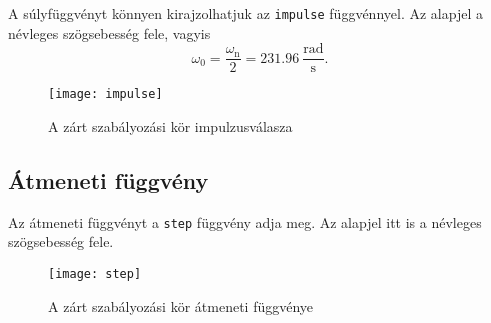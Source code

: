 A súlyfüggvényt könnyen kirajzolhatjuk az \verb|impulse| függvénnyel.
Az alapjel a névleges szögsebesség fele, vagyis
\begin{equation}
	\omega_0 = \frac{\omega_\text{n}}{2} = 231.96~\frac{\text{rad}}{\text{s}}.
\end{equation}

\begin{figure}[H]
	\centering
	\texttt{[image: impulse]}
	\caption{A zárt szabályozási kör impulzusválasza}
	\label{fig:impulse}
\end{figure}


\subsection{Átmeneti függvény}

Az átmeneti függvényt a \verb|step| függvény adja meg.
Az alapjel itt is a névleges szögsebesség fele.

\begin{figure}[H]
	\centering
	\texttt{[image: step]}
	\caption{A zárt szabályozási kör átmeneti függvénye}
	\label{fig:step}
\end{figure}

